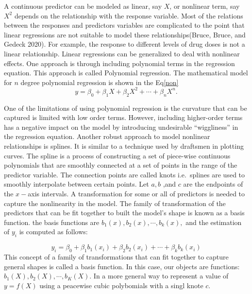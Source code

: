 \documentclass[
  12pt,
]{article}
\begin{document}
A continuous predictor can be modeled as linear, say \(X\), or nonlinear term, say \(X^2\) depends on the relationship with the response variable. Most of the relations between the responses and predictors variables are complicated to the point that linear regressions are not suitable to model these relationships(Bruce, Bruce, and Gedeck 2020). For example, the response to different levels of drug doses is not a linear relationship. Linear regressions can be generalized to deal with nonlinear effects. One approach is through including polynomial terms in the regression equation. This approach is called Polynomial regression. The mathematical model for \(n\) degree polynomial regression is shown in the Eq\eqref{non}
\begin{equation}\label{non}
 y=\beta_0+\beta_1 X+\beta_2 X^2+\cdots+\beta_nX^n.
 \end{equation}

One of the limitations of using polynomial regression is the curvature that can be captured is limited with low order terms. However, including higher-order terms has a negative impact on the model by introducing undesirable ``wiggliness'' in the regression equation. Another robust approach to model nonlinear relationships is splines. It is similar to a technique used by draftsmen in plotting curves. The spline is a process of constructing a set of piece-wise continuous
polynomials that are smoothly connected at a set of points in the range of the predictor variable. The connection points are called knots i.e.~splines are used to smoothly interpolate between certain points. Let \(a,b\) ,and \(c\) are the endpoints of the \(x-\)axis intervals.
A transformation for some or all of predictors is needed to capture the nonlinearity in the model. The family of transformation of the predictors that can be fit together to built the model's shape is known as a basis function.
the basis functions are \(b_1(x),b_2(x), \cdots,b_k(x),\) and the estimation of \(y_i\) is computed as follows:

\begin{equation}
y_i=\beta_0+\beta_1 b_1(x_i)+\beta_2 b_2(x_i)+\cdots+ \beta_k b_k(x_i)
\end{equation}
This concept of a family of transformations that can fit together to capture general shapes is called a basis function. In this case, our objects are functions: \(b_1 (X ), b_2 (X ),\cdots , b_K (X ).\) In a more general way to represent a value of \(y=f(X)\) using a peacewise cubic polybomials with a singl knote \(c.\)
\end{document}
